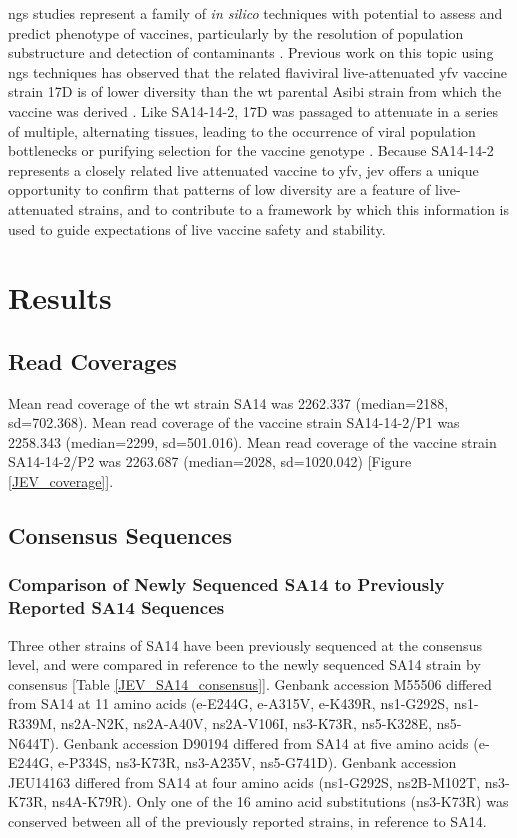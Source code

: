 \Gls{ngs} studies represent a family of \emph{in silico} techniques with potential to assess and predict phenotype of vaccines, particularly by the resolution of population substructure and detection of contaminants \parencite{Prachi:2013hm, Luciani:2012em, Victoria:2010kf}. Previous work on this topic using \gls{ngs} techniques has observed that the related flaviviral live-attenuated \gls{yfv} vaccine strain 17D is of lower diversity than the \gls{wt} parental Asibi strain from which the vaccine was derived \parencite{Beck:2014cm}. Like SA14-14-2, 17D was passaged to attenuate in a series of multiple, alternating tissues, leading to the occurrence of viral population bottlenecks or purifying selection for the vaccine genotype \parencite{Theiler:1937wy}. Because SA14-14-2 represents a closely related live attenuated vaccine to \gls{yfv}, \gls{jev} offers a unique opportunity to confirm that patterns of low diversity are a feature of live-attenuated strains, and to contribute to a framework by which this information is used to guide expectations of live vaccine safety and stability.



\section{Results}
\subsection{Read Coverages}
Mean read coverage of the \gls{wt} strain SA14 was 2262.337 (median=2188, \gls{sd}=702.368). Mean read coverage of the vaccine strain SA14-14-2/P1 was 2258.343 (median=2299, \gls{sd}=501.016). Mean read coverage of the vaccine strain SA14-14-2/P2 was 2263.687 (median=2028, \gls{sd}=1020.042) [Figure \ref{JEV_coverage}].

\subsection{Consensus Sequences}
\subsubsection{Comparison of Newly Sequenced SA14 to Previously Reported SA14 Sequences}
Three other strains of SA14 have been previously sequenced at the consensus level, and were compared in reference to the newly sequenced SA14 strain by consensus [Table \ref{JEV_SA14_consensus}]. Genbank accession M55506 \parencite{Nitayaphan:1990vr} differed from SA14 at 11 amino acids (\gls{e}-E244G, \gls{e}-A315V, \gls{e}-K439R, \gls{ns}1-G292S, \gls{ns}1-R339M, \gls{ns}2A-N2K, \gls{ns}2A-A40V, \gls{ns}2A-V106I, \gls{ns}3-K73R, \gls{ns}5-K328E, \gls{ns}5-N644T). Genbank accession D90194 \parencite{Aihara:1991tn} differed from SA14 at five amino acids (\gls{e}-E244G, \gls{e}-P334S, \gls{ns}3-K73R, \gls{ns}3-A235V, \gls{ns}5-G741D). Genbank accession JEU14163 \parencite{Ni:1994vs} differed from SA14 at four amino acids (\gls{ns}1-G292S, \gls{ns}2B-M102T, \gls{ns}3-K73R, \gls{ns}4A-K79R). Only one of the 16 amino acid substitutions (\gls{ns}3-K73R) was conserved between all of the previously reported strains, in reference to SA14.

